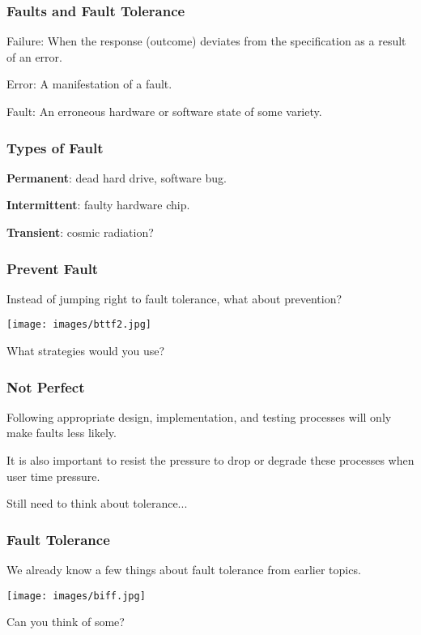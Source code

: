 \begin{frame}
\frametitle{Faults and Fault Tolerance}

\alert{Failure}: When the response (outcome) deviates from the specification as a result of an error.

\alert{Error}: A manifestation of a fault.

\alert{Fault}: An erroneous hardware or software state of some variety.

\end{frame}

\begin{frame}
\frametitle{Types of Fault}

\textbf{Permanent}: dead hard drive, software bug.

\textbf{Intermittent}: faulty hardware chip.

\textbf{Transient}: cosmic radiation?

\end{frame}

\begin{frame}
\frametitle{Prevent Fault}

Instead of jumping right to fault tolerance, what about prevention?

\begin{center}
	\texttt{[image: images/bttf2.jpg]}
\end{center}

What strategies would you use?

\end{frame}

\begin{frame}
\frametitle{Not Perfect}

Following appropriate design, implementation, and testing processes will only make faults less likely.

It is also important to resist the pressure to drop or degrade these processes when user time pressure.

Still need to think about tolerance...

\end{frame}

\begin{frame}
\frametitle{Fault Tolerance}

We already know a few things about fault tolerance from earlier topics.

\begin{center}
	\texttt{[image: images/biff.jpg]}
\end{center}

Can you think of some?

\end{frame}

